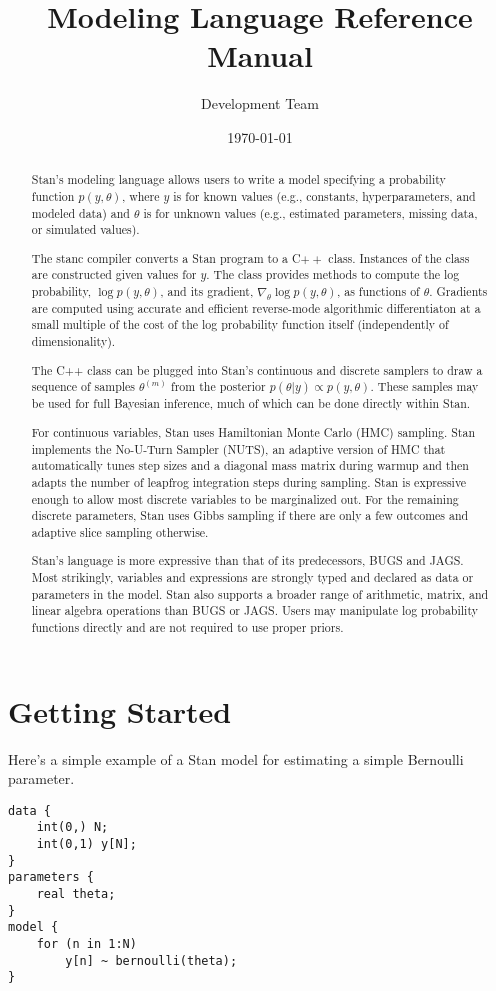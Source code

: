 \documentclass[11pt]{report}
\title{\Stan Modeling Language Reference Manual}
\author{\Stan Development Team}
\date{\footnotesize \today}
\newcommand{\Stan}{Stan\xspace}
\newcommand*{\Cpp}{C{\ensuremath{++}}\xspace}
\begin{document}
\maketitle

\begin{abstract}
  \Stan's modeling language allows users to write a model specifying a
  probability function $p(y,\theta)$, where $y$ is for known values
  (e.g., constants, hyperparameters, and modeled data) and $\theta$ is
  for unknown values (e.g., estimated parameters, missing data, or
  simulated values).

  The stanc compiler converts a Stan program to a \Cpp class.
  Instances of the class are constructed given values for
  $y$.  The class provides methods to compute the log probability,
  $\log p(y,\theta)$, and its gradient, $\nabla_{\theta} \log
  p(y,\theta)$, as functions of $\theta$.  Gradients are computed using
  accurate and efficient reverse-mode algorithmic differentiaton at a
  small multiple of the cost of the log probability function itself
  (independently of dimensionality).
  
  The C++ class can be plugged into Stan's continuous and discrete
  samplers to draw a sequence of samples $\theta^{(m)}$ from the
  posterior $p(\theta|y) \propto p(y,\theta)$.  These samples may be
  used for full Bayesian inference, much of which can be done directly
  within Stan.

  For continuous variables, Stan uses Hamiltonian Monte Carlo (HMC)
  sampling.  Stan implements the No-U-Turn Sampler (NUTS), an adaptive
  version of HMC that automatically tunes step sizes and a diagonal
  mass matrix during warmup and then adapts the number of leapfrog
  integration steps during sampling.  Stan is expressive enough to
  allow most discrete variables to be marginalized out.  For the remaining
  discrete parameters, Stan uses Gibbs sampling if there are only a few
  outcomes and adaptive slice sampling otherwise.

  Stan's language is more expressive than that of its predecessors,
  BUGS and JAGS.  Most strikingly, variables and expressions are
  strongly typed and declared as data or parameters in the model.
  Stan also supports a broader range of arithmetic, matrix, and linear
  algebra operations than BUGS or JAGS.  Users may manipulate
  log probability functions directly and are not required to use
  proper priors.

\end{abstract}

\chapter{Getting Started}

Here's a simple example of a Stan model for estimating a simple
Bernoulli parameter.

\begin{verbatim}
data {
    int(0,) N;
    int(0,1) y[N];
}
parameters {
    real theta;
}
model {
    for (n in 1:N)
        y[n] ~ bernoulli(theta);
}
\end{verbatim}
\end{document}
